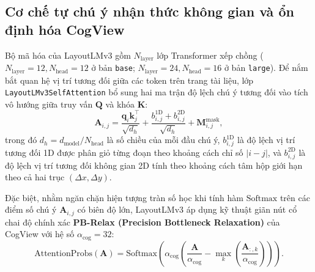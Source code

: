 \subsection{Cơ chế tự chú ý nhận thức không gian và ổn định hóa CogView}
Bộ mã hóa của LayoutLMv3 gồm $N_{\text{layer}}$ lớp Transformer xếp chồng ($N_{\text{layer}} = 12, N_{\text{head}} = 12$ ở bản \texttt{base}; $N_{\text{layer}} = 24, N_{\text{head}} = 16$ ở bản \texttt{large}). Để nắm bắt quan hệ vị trí tương đối giữa các token trên trang tài liệu, lớp \texttt{LayoutLMv3SelfAttention} bổ sung hai ma trận độ lệch chú ý tương đối vào tích vô hướng giữa truy vấn $\mathbf{Q}$ và khóa $\mathbf{K}$:
\begin{equation}
    \label{eq:rel_attn_scores}
    \mathbf{A}_{i,j} = \frac{\mathbf{q}_i \mathbf{k}_j^\top}{\sqrt{d_h}} + \frac{b_{i,j}^{\text{1D}} + b_{i,j}^{\text{2D}}}{\sqrt{d_h}} + \mathbf{M}_{i,j}^{\text{mask}},
\end{equation}
trong đó $d_h = d_{\text{model}} / N_{\text{head}}$ là số chiều của mỗi đầu chú ý, $b_{i,j}^{\text{1D}}$ là độ lệch vị trí tương đối 1D được phân giỏ từng đoạn theo khoảng cách chỉ số $|i - j|$, và $b_{i,j}^{\text{2D}}$ là độ lệch vị trí tương đối không gian 2D tính theo khoảng cách tâm hộp giới hạn theo cả hai trục $(\Delta x, \Delta y)$.

Đặc biệt, nhằm ngăn chặn hiện tượng tràn số học khi tính hàm $\text{Softmax}$ trên các điểm số chú ý $\mathbf{A}_{i,j}$ có biên độ lớn, LayoutLMv3 áp dụng kỹ thuật giãn nút cổ chai độ chính xác \textbf{PB-Relax (Precision Bottleneck Relaxation)} của CogView \cite{ding2021cogview} với hệ số $\alpha_{\text{cog}} = 32$:
\begin{equation}
    \label{eq:cogview_softmax}
    \text{AttentionProbs}(\mathbf{A}) = \text{Softmax}\!\left( \alpha_{\text{cog}} \left( \frac{\mathbf{A}}{\alpha_{\text{cog}}} - \max_{k}\left(\frac{\mathbf{A}_{:,k}}{\alpha_{\text{cog}}}\right) \right) \right).
\end{equation}

